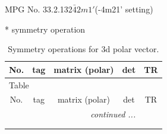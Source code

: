 \documentclass[fleqn,8pt]{jsarticle}
\begin{document}
\setcounter{MaxMatrixCols}{32}

\renewcommand{\tablename}{Table~}
\renewcommand{\figurename}{Figure~}
\begin{center}
\LARGE
MPG No. 33.2.132\quad$\bar{4}2m1'$\quad(-4m21' setting)
\end{center}
* symmetry operation
\renewcommand{\arraystretch}{1.3}
\begin{longtable}{ccccc}
\caption{Symmetry operations for 3d polar vector.}
 \\
 \hline \hline
No. & tag & matrix (polar) & det & TR \\ \hline \endfirsthead

\multicolumn{4}{l}{\tablename\ \thetable{}} \\
 \hline \hline
No. & tag & matrix (polar) & det & TR \\ \hline \endhead

 \hline \hline
\multicolumn{4}{r}{\footnotesize\it continued ...} \\ \endfoot

 \hline \hline
\multicolumn{4}{r}{} \\ \endlastfoot


\end{longtable}
\end{document}

